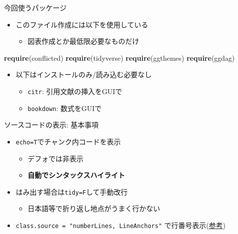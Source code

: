 \documentclass[
  14pt,
  ignorenonframetext,
]{beamer}
\newenvironment{Shaded}{\begin{snugshade}}{\end{snugshade}}
\newcommand{\KeywordTok}[1]{\textcolor[rgb]{0.13,0.29,0.53}{\textbf{#1}}}
\newcommand{\NormalTok}[1]{#1}
\providecommand{\tightlist}{%
  \setlength{\itemsep}{0pt}\setlength{\parskip}{0pt}}
\begin{document}
\begin{frame}[fragile]{今回使うパッケージ}
\protect\hypertarget{ux4ecaux56deux4f7fux3046ux30d1ux30c3ux30b1ux30fcux30b8}{}

\begin{itemize}
\tightlist
\item
  このファイル作成には以下を使用している

  \begin{itemize}
  \tightlist
  \item
    図表作成とか最低限必要なものだけ
  \end{itemize}
\end{itemize}

\begin{Shaded}
\begin{Highlighting}[numbers=left,,]
\KeywordTok{require}\NormalTok{(conflicted)}
\KeywordTok{require}\NormalTok{(tidyverse)}
\KeywordTok{require}\NormalTok{(ggthemes)}
\KeywordTok{require}\NormalTok{(ggdag)}
\end{Highlighting}
\end{Shaded}

\begin{itemize}
\tightlist
\item
  以下はインストールのみ/読み込む必要なし

  \begin{itemize}
  \tightlist
  \item
    \texttt{citr}: 引用文献の挿入をGUIで
  \item
    \texttt{bookdown}: 数式をGUIで
  \end{itemize}
\end{itemize}

\end{frame}

\begin{frame}[fragile]{ソースコードの表示: 基本事項}
\protect\hypertarget{ux30bdux30fcux30b9ux30b3ux30fcux30c9ux306eux8868ux793a-ux57faux672cux4e8bux9805}{}

\begin{itemize}
\tightlist
\item
  \texttt{echo=T}でチャンク内コードを表示

  \begin{itemize}
  \tightlist
  \item
    デフォでは非表示
  \item
    \textbf{自動でシンタックスハイライト}
  \end{itemize}
\item
  はみ出す場合は\texttt{tidy=F}して手動改行

  \begin{itemize}
  \tightlist
  \item
    日本語等で折り返し地点がうまく行かない
  \end{itemize}
\item
  \texttt{class.source\ =\ "numberLines,\ LineAnchors"}
  で行番号表示(\href{https://blog.atusy.net/2019/04/18/rmd-line-num/}{参考})
\end{itemize}

\end{frame}
\end{document}
